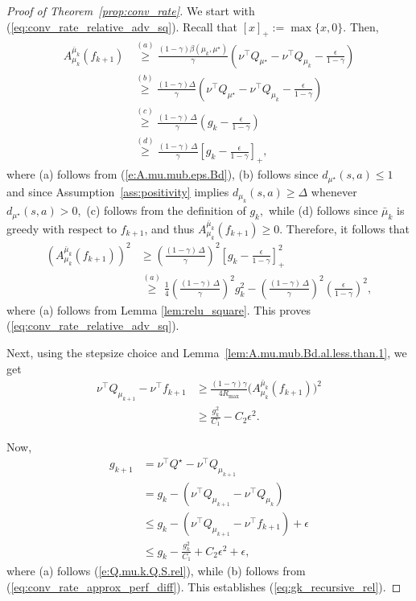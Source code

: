 \documentclass[twoside]{article}
\theoremstyle{plain}
\theoremstyle{definition}
\theoremstyle{remark}
\renewcommand{\eqref}[1]{(\ref{#1})}
\begin{document}
\begin{proof}[Proof of Theorem~\ref{prop:conv_rate}]
We start with \eqref{eq:conv_rate_relative_adv_sq}. Recall that $[x]_+ := \max\{x,0\}.$ Then, 
%
\begin{align*}
    A_{\mu_k}^{\bar\mu_k}(f_{k+1}) & \overset{(a)}{\ge} 
    \frac{(1 - \gamma) \beta(\mu_k, \mu^\star)}{\gamma} \left(\nu^\top Q_{\mu^\star} - \nu^\top Q_{\mu_k} - \frac{\epsilon}{1-\gamma}\right)\\
    & \overset{(b)}{\ge} \frac{(1 - \gamma) \Delta}{\gamma} \left(\nu^\top Q_{\mu^\star} - \nu^\top Q_{\mu_k} - \frac{\epsilon}{1-\gamma}\right)\\
    & \overset{(c)}{\ge} \frac{(1-\gamma)\,\Delta}{\gamma} \left( g_k - \frac{\epsilon}{1-\gamma} \right)\\
    & \overset{(d)}{\ge} \frac{(1-\gamma)\,\Delta}{\gamma} \left[ g_k - \frac{\epsilon}{1-\gamma} \right]_+,
%
\end{align*}
%
where (a) follows from \eqref{e:A.mu.mub.eps.Bd}, (b) follows since $d_{\mu^\star}(s, a) \leq 1$ and since Assumption~\ref{ass:positivity} implies $d_{\mu_k}(s, a) \geq \Delta$ whenever $d_{\mu^\star}(s, a) > 0,$ (c) follows from the definition of $g_k,$ while (d) follows since $\bar\mu_k$ is greedy with respect to $f_{k+1}$, and thus
$A_{\mu_k}^{\bar\mu_k}(f_{k+1}) \ge 0.$ Therefore, it follows that
%
\begin{align*}
    \left(A_{\mu_k}^{\bar\mu_k}(f_{k+1})\right)^2 
    & \ge \left(\frac{(1-\gamma)\,\Delta}{\gamma} \right)^2\left[ g_k - \frac{\epsilon}{1-\gamma} \right]_+^2\\
    & \overset{(a)}{\ge} \frac{1}{4} \left(\frac{(1-\gamma)\,\Delta}{\gamma} \right)^2 g_k^2 - \left(\frac{(1-\gamma)\,\Delta}{\gamma} \right)^2 \left(\frac{\epsilon}{1-\gamma}\right)^2, 
\end{align*}
%
where (a) follows from Lemma \ref{lem:relu_square}. This proves \eqref{eq:conv_rate_relative_adv_sq}. 

Next, using the stepsize choice and Lemma~\ref{lem:A.mu.mub.Bd.al.less.than.1}, we get
\begin{align}
\nu^\top Q_{\mu_{k+1}} - \nu^\top f_{k+1}
&\ge \frac{(1-\gamma)\gamma}{4R_{\max}} 
\big(A_{\mu_k}^{\bar\mu_k}(f_{k+1})\big)^2 \nonumber \\
%
&\ge \frac{g_k^2}{C_1} - C_2 \epsilon^2 \label{eq:conv_rate_approx_perf_diff}.
\end{align}

Now, 
\begin{align*}
g_{k+1}
&= \nu^\top Q^\star - \nu^\top Q_{\mu_{k+1}} \\
&= g_k - (\nu^\top Q_{\mu_{k+1}} - \nu^\top Q_{\mu_k}) \\
&\le g_k - (\nu^\top Q_{\mu_{k+1}} - \nu^\top f_{k+1}) + \epsilon \\
&\le g_k - \frac{g_k^2}{C_1} + C_2 \epsilon^2 + \epsilon,
\end{align*}
where (a) follows \eqref{e:Q.mu.k.Q.S.rel}, while (b) follows from \eqref{eq:conv_rate_approx_perf_diff}. This establishes \eqref{eq:gk_recursive_rel}.


\end{proof}
\end{document}
